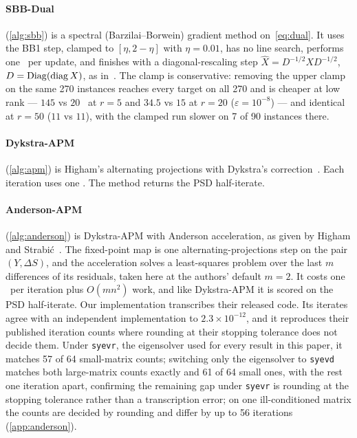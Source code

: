 \paragraph{SBB-Dual} (\cref{alg:sbb}) is a spectral (Barzilai--Borwein)
gradient method on~\eqref{eq:dual}. It uses the BB1 step, clamped to
$[\eta,2-\eta]$ with $\eta=0.01$, has no line search, performs one \EVD\ per
update, and finishes with a diagonal-rescaling step
$\hat X=D^{-1/2}XD^{-1/2}$, $D=\operatorname{Diag}(\operatorname{diag} X)$, as in~\cite{borsdorf2010preconditioned}.
The clamp is conservative: removing the upper clamp on the same 270 instances
reaches every target on all 270 and is cheaper at low rank --- $145$ vs $20$
\EVDs\ at $r=5$ and $34.5$ vs $15$ at $r=20$ ($\varepsilon=10^{-8}$) --- and
identical at $r=50$ ($11$ vs $11$), with the clamped run slower on 7 of 90
instances there.

\paragraph{Dykstra-APM} (\cref{alg:apm}) is Higham's alternating projections
with Dykstra's correction~\cite{higham2002nearest}. Each iteration uses one \EVD. The
method returns the PSD half-iterate.

\paragraph{Anderson-APM} (\cref{alg:anderson}) is Dykstra-APM with Anderson
acceleration, as given by Higham and Strabi\'{c}~\cite{higham2016anderson}. The
fixed-point map is one alternating-projections step on the pair $(Y,\Delta S)$,
and the acceleration solves a least-squares problem over the last $m$ differences
of its residuals, taken here at the authors' default $m=2$. It costs one \EVD\ per
iteration plus $O(mn^2)$ work, and like Dykstra-APM it is scored on the PSD
half-iterate. Our implementation transcribes their released code. Its iterates
agree with an independent implementation to $2.3\times10^{-12}$, and it
reproduces their published iteration counts where rounding at their stopping
tolerance does not decide them. Under \texttt{syevr}, the eigensolver used for
every result in this paper, it matches 57 of 64 small-matrix counts; switching
only the eigensolver to \texttt{syevd} matches both large-matrix counts
exactly and 61 of 64 small ones, with the rest one iteration apart, confirming
the remaining gap under \texttt{syevr} is rounding at the stopping tolerance
rather than a transcription error; on one ill-conditioned matrix the counts
are decided by rounding and differ by up to 56 iterations
(\cref{app:anderson}).

